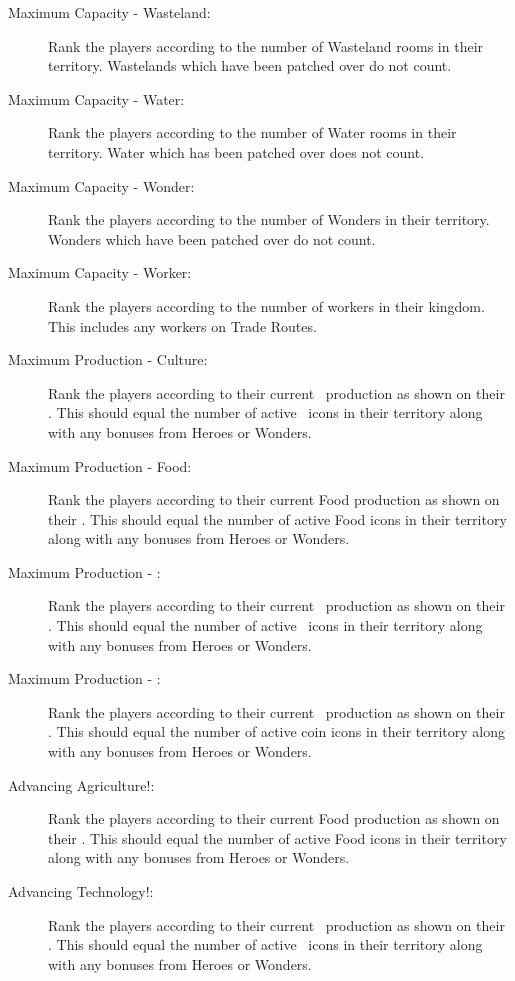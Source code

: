 \documentclass[10pt,twocolumn]{article}
\begin{document}
{\begin{description}
\item[Maximum Capacity - Wasteland:] Rank the players according to the number of Wasteland rooms in their territory. Wastelands which have been patched over do not count.
\item[Maximum Capacity - Water:] Rank the players according to the number of Water rooms in their territory. Water which has been patched over does not count.
\item[Maximum Capacity - Wonder:] Rank the players according to the number of Wonders in their territory. Wonders which have been patched over do not count.
\item[Maximum Capacity - Worker:] Rank the players according to the number of workers in their kingdom. This includes any workers on Trade Routes.
\item[Maximum Production - Culture:] Rank the players according to their current \victorypoint\ production as shown on their \psb. This should equal the number of active \victorypoint\ icons in their territory along with any bonuses from Heroes or Wonders.
\item[Maximum Production - Food:] Rank the players according to their current Food production as shown on their \psb. This should equal the number of active Food icons in their territory along with any bonuses from Heroes or Wonders.
\item[Maximum Production - \mineral:] Rank the players according to their current \mineral\ production as shown on their \psb. This should equal the number of active \mineral\ icons in their territory along with any bonuses from Heroes or Wonders.
\item[Maximum Production - \money:] Rank the players according to their current \money\ production as shown on their \psb. This should equal the number of active coin icons in their territory along with any bonuses from Heroes or Wonders.
\end{description}
}{
\begin{description}
\item[Advancing Agriculture!:] Rank the players according to their current Food production as shown on their \psb. This should equal the number of active Food icons in their territory along with any bonuses from Heroes or Wonders.
\item[Advancing Technology!:] Rank the players according to their current \mineral\ production as shown on their \psb. This should equal the number of active \mineral\ icons in their territory along with any bonuses from Heroes or Wonders.

\end{description}}
\end{document}
